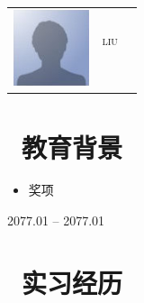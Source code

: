 \documentclass{resume}
\begin{document}

{
\Large{
 \begin{onehalfspacing}
 \begin{tabu}{c l l}
   \hspace{1em}
 	& \\
 	\vspace{1ex}
    & \huge{\scshape{liu}}\\
    &  
    &  \\
    &  &
    \hspace{2em} {\textit{}} \\
    & \\
  \end{tabu}
   \end{onehalfspacing}
	}
} 
\vspace{-4ex}
\section{\faGraduationCap\  教育背景}
\begin{onehalfspacing}
\begin{itemize}
  \item 奖项
\end{itemize}
\end{onehalfspacing}
 {2077.01 -- 2077.01}
\begin{onehalfspacing}
\end{onehalfspacing}

\section{\faUsers\ 实习经历}
\
\vspace{-2ex}
\begin{onehalfspacing}
\end{onehalfspacing}
\end{document}
